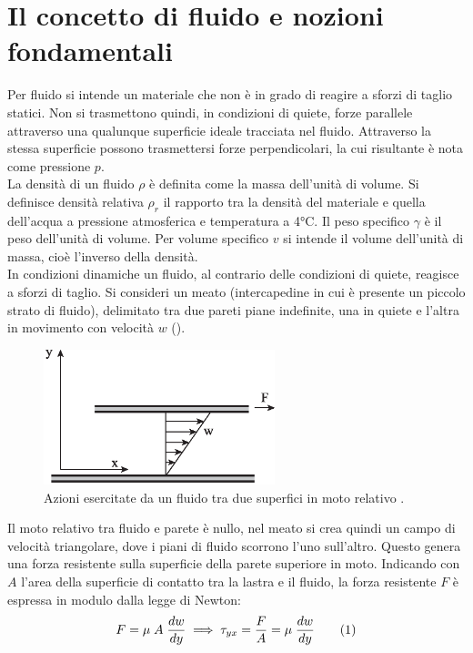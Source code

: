 \section{Il concetto di fluido e nozioni fondamentali}
Per fluido si intende un materiale che non è in grado di reagire a sforzi di taglio statici. Non si trasmettono quindi, in condizioni di quiete, forze parallele attraverso una qualunque superficie ideale tracciata nel fluido. Attraverso la stessa superficie possono trasmettersi forze perpendicolari, la cui risultante è nota come pressione \(p\).\\
La densità di un fluido \(\rho\) è definita come la massa dell'unità di volume. Si definisce densità relativa \(\rho_r\) il rapporto tra la densità del materiale e quella dell'acqua a pressione atmosferica e temperatura a 4°C. Il peso specifico \(\gamma\) è il peso dell'unità di volume. Per volume specifico \(v\) si intende il volume dell'unità di massa, cioè l'inverso della densità. \\
In condizioni dinamiche un fluido, al contrario delle condizioni di quiete, reagisce a sforzi di taglio. Si consideri un meato (intercapedine in cui è presente un piccolo strato di fluido), delimitato tra due pareti piane indefinite, una in quiete e l'altra in movimento con velocità \(w\) ().
\begin{figure}[htbp] %
    \centering
    \includegraphics[width=0.6\textwidth]{fig/fluidodinamica/meato.eps}
    \caption{Azioni esercitate da un fluido tra due superfici in moto relativo \parencite{guglielmini2004lezioni}.} 
    \label{fig:meato}
\end{figure}
Il moto relativo tra fluido e parete è nullo, nel meato si crea quindi un campo di velocità triangolare, dove i piani di fluido scorrono l'uno sull'altro. Questo genera una forza resistente sulla superficie della parete superiore in moto. Indicando con \(A\) l'area della superficie di contatto tra  la lastra e il fluido, la forza resistente \(F\)  è espressa in modulo dalla legge di Newton:
\[F= \mu \; A \; \frac{dw}{dy} \implies \tau_{yx} = \frac{F}{A} = \mu \; \frac{dw}{dy} \addtag \label{eq:newton} \]

